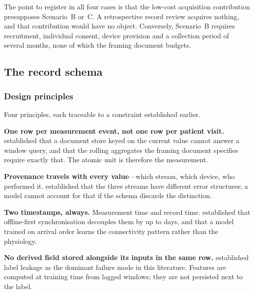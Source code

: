 \documentclass[12pt,a4paper,oneside]{report}
\begin{document}
The point to register in all four cases is that the low-cost acquisition contribution presupposes Scenario~B or~C. A retrospective record review acquires nothing, and that contribution would have no object. Conversely, Scenario~B requires recruitment, individual consent, device provision and a collection period of several months, none of which the framing document budgets.

\subsection{The record schema}\label{sec:record-schema}

\subsubsection{Design principles}

Four principles, each traceable to a constraint established earlier.

\textbf{One row per measurement event, not one row per patient visit.}  established that a document store keyed on the current value cannot answer a window query, and that the rolling aggregates the framing document specifies require exactly that. The atomic unit is therefore the measurement.

\textbf{Provenance travels with every value}---which stream, which device, who performed it.  established that the three streams have different error structures; a model cannot account for that if the schema discards the distinction.

\textbf{Two timestamps, always.} Measurement time and record time.  established that offline-first synchronisation decouples them by up to days, and that a model trained on arrival order learns the connectivity pattern rather than the physiology.

\textbf{No derived field stored alongside its inputs in the same row.}  established label leakage as the dominant failure mode in this literature. Features are computed at training time from lagged windows; they are not persisted next to the label.
\end{document}

